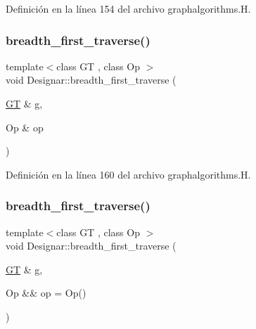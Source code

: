 Definición en la línea 154 del archivo graphalgorithms.\+H.

\mbox{\label{namespace_designar_a0e5a24c14d4d7a9281cd79d82b8f4346}} 
\subsubsection{\texorpdfstring{breadth\+\_\+first\+\_\+traverse()}{breadth\_first\_traverse()}\hspace{0.1cm}{\footnotesize\ttfamily [3/4]}}
{\footnotesize\ttfamily template$<$class GT , class Op $>$ \\
void Designar\+::breadth\+\_\+first\+\_\+traverse (\begin{DoxyParamCaption}\item[{\hyperlink{demo-buildgraph_8_c_a3001c40d2c31ca87ed96cd7d1334a55e}{GT} \&}]{g,  }\item[{Op \&}]{op }\end{DoxyParamCaption})}



Definición en la línea 160 del archivo graphalgorithms.\+H.

\mbox{\label{namespace_designar_ad3ef274c9191673599894089bbfb354d}} 
\subsubsection{\texorpdfstring{breadth\+\_\+first\+\_\+traverse()}{breadth\_first\_traverse()}\hspace{0.1cm}{\footnotesize\ttfamily [4/4]}}
{\footnotesize\ttfamily template$<$class GT , class Op $>$ \\
void Designar\+::breadth\+\_\+first\+\_\+traverse (\begin{DoxyParamCaption}\item[{\hyperlink{demo-buildgraph_8_c_a3001c40d2c31ca87ed96cd7d1334a55e}{GT} \&}]{g,  }\item[{Op \&\&}]{op = {\ttfamily Op()} }\end{DoxyParamCaption})}



